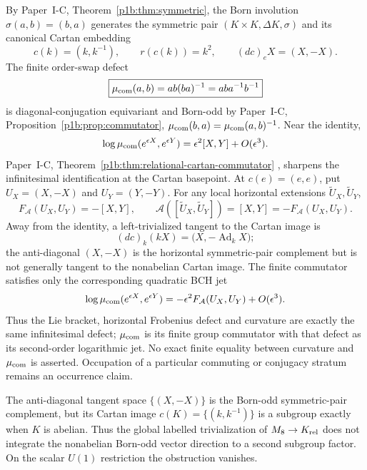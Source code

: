 \documentclass[12pt,a4paper]{article}
\begin{document}
\begin{theorem}
\label{p3b:thm:v187-cartan-embedding-commutator}
By Paper~I-C, Theorem~\ref{p1b:thm:symmetric}, the Born involution
$\sigma(a,b)=(b,a)$ generates the symmetric pair
$(K\times K,\Delta K,\sigma)$ and its canonical Cartan embedding
\[
 \boxed{c(k)=(k,k^{-1}),\qquad r(c(k))=k^2,\qquad
 (dc)_eX=(X,-X).}
\]
The finite order-swap defect
\[
 \boxed{\mu_{\rm com}(a,b)=ab(ba)^{-1}=aba^{-1}b^{-1}}
\]
is diagonal-conjugation equivariant and Born-odd by Paper~I-C,
Proposition~\ref{p1b:prop:commutator},
$\mu_{\rm com}(b,a)=\mu_{\rm com}(a,b)^{-1}$.  Near the identity,
\[
 \log\mu_{\rm com}(e^{\epsilon X},e^{\epsilon Y})
 =\epsilon^2[X,Y]+O(\epsilon^3).
\]
Paper~I-C, Theorem~\ref{p1b:thm:relational-cartan-commutator}
\cite{Kugelmann2026Paper1B}, sharpens the infinitesimal identification at the
Cartan basepoint.  At \(c(e)=(e,e)\), put
\(U_X=(X,-X)\) and \(U_Y=(Y,-Y)\).  For any local horizontal extensions
\(\widetilde U_X,\widetilde U_Y\),
\[
 F_{\mathcal A}(U_X,U_Y)=-[X,Y],\qquad
 \mathcal A([\widetilde U_X,\widetilde U_Y])=[X,Y]
 =-F_{\mathcal A}(U_X,U_Y).
\]
Away from the identity, a left-trivialized tangent to the Cartan image is
\[
 (dc)_k(kX)=\bigl(X,-\operatorname{Ad}_kX\bigr);
\]
the anti-diagonal \((X,-X)\) is the horizontal symmetric-pair complement but
is not generally tangent to the nonabelian Cartan image.  The finite
commutator satisfies only the corresponding quadratic BCH jet
\[
 \log\mu_{\rm com}(e^{\epsilon X},e^{\epsilon Y})
 =-\epsilon^2F_{\mathcal A}(U_X,U_Y)+O(\epsilon^3).
\]
Thus the Lie bracket, horizontal Frobenius defect and curvature are exactly
the same infinitesimal defect; \(\mu_{\rm com}\) is its finite group
commutator with that defect as its second-order logarithmic jet.  No exact
finite equality between curvature and \(\mu_{\rm com}\) is asserted.
Occupation of a particular commuting or conjugacy stratum remains an
occurrence claim.
\end{theorem}

\begin{remark}
\label{p3b:rem:v193-antidiagonal-global-firewall}
The anti-diagonal tangent space \(\{(X,-X)\}\) is the Born-odd symmetric-pair
complement, but its Cartan image
\(c(K)=\{(k,k^{-1})\}\) is a subgroup exactly when \(K\) is abelian.  Thus
the global labelled trivialization of \(M_8\to K_{\rm rel}\) does not
integrate the nonabelian Born-odd vector direction to a second subgroup
factor.  On the scalar \(U(1)\) restriction the obstruction vanishes.
\end{remark}
\end{document}
